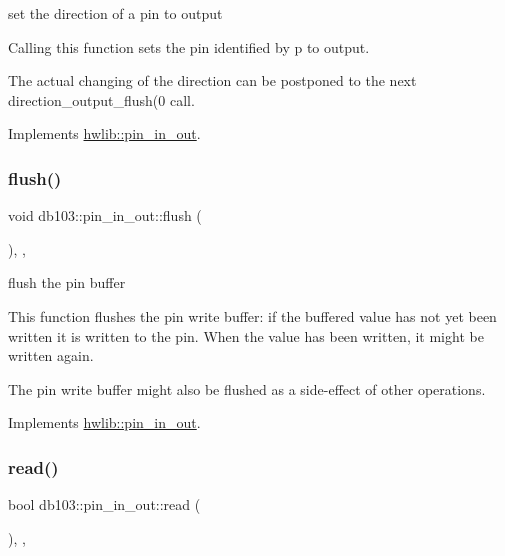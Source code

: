 set the direction of a pin to output

Calling this function sets the pin identified by p to output.

The actual changing of the direction can be postponed to the next direction\+\_\+output\+\_\+flush(0 call. 

Implements \hyperlink{classhwlib_1_1pin__in__out_ad08a5f5e9a4c3aadaa7c665b98f2418e}{hwlib\+::pin\+\_\+in\+\_\+out}.

\mbox{\label{classdb103_1_1pin__in__out_a7cfd446e8a7c4453345ac3ec53d386ce}} 
\subsubsection{\texorpdfstring{flush()}{flush()}}
{\footnotesize\ttfamily void db103\+::pin\+\_\+in\+\_\+out\+::flush (\begin{DoxyParamCaption}{ }\end{DoxyParamCaption})\hspace{0.3cm}{\ttfamily [inline]}, {\ttfamily [override]}, {\ttfamily [virtual]}}

flush the pin buffer

This function flushes the pin write buffer\+: if the buffered value has not yet been written it is written to the pin. When the value has been written, it might be written again.

The pin write buffer might also be flushed as a side-\/effect of other operations. 

Implements \hyperlink{classhwlib_1_1pin__in__out_a5207c9e30f0c88e4c052952397c2da88}{hwlib\+::pin\+\_\+in\+\_\+out}.

\mbox{\label{classdb103_1_1pin__in__out_a67a48a90485305275ce4573f5e371f6a}} 
\subsubsection{\texorpdfstring{read()}{read()}}
{\footnotesize\ttfamily bool db103\+::pin\+\_\+in\+\_\+out\+::read (\begin{DoxyParamCaption}{ }\end{DoxyParamCaption})\hspace{0.3cm}{\ttfamily [inline]}, {\ttfamily [override]}, {\ttfamily [virtual]}}

